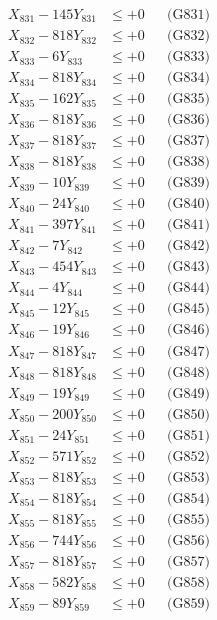 \documentclass[a4paper,10pt]{article}
\begin{document}
{\begin{align}
\allowbreak
X_{831} - 145Y_{831} &\leq +0 && \text{(G831)} \\
X_{832} - 818Y_{832} &\leq +0 && \text{(G832)} \\
X_{833} - 6Y_{833} &\leq +0 && \text{(G833)} \\
X_{834} - 818Y_{834} &\leq +0 && \text{(G834)} \\
X_{835} - 162Y_{835} &\leq +0 && \text{(G835)} \\
X_{836} - 818Y_{836} &\leq +0 && \text{(G836)} \\
X_{837} - 818Y_{837} &\leq +0 && \text{(G837)} \\
X_{838} - 818Y_{838} &\leq +0 && \text{(G838)} \\
X_{839} - 10Y_{839} &\leq +0 && \text{(G839)} \\
X_{840} - 24Y_{840} &\leq +0 && \text{(G840)} \\
\allowbreak
X_{841} - 397Y_{841} &\leq +0 && \text{(G841)} \\
X_{842} - 7Y_{842} &\leq +0 && \text{(G842)} \\
X_{843} - 454Y_{843} &\leq +0 && \text{(G843)} \\
X_{844} - 4Y_{844} &\leq +0 && \text{(G844)} \\
X_{845} - 12Y_{845} &\leq +0 && \text{(G845)} \\
X_{846} - 19Y_{846} &\leq +0 && \text{(G846)} \\
X_{847} - 818Y_{847} &\leq +0 && \text{(G847)} \\
X_{848} - 818Y_{848} &\leq +0 && \text{(G848)} \\
X_{849} - 19Y_{849} &\leq +0 && \text{(G849)} \\
X_{850} - 200Y_{850} &\leq +0 && \text{(G850)} \\
\allowbreak
X_{851} - 24Y_{851} &\leq +0 && \text{(G851)} \\
X_{852} - 571Y_{852} &\leq +0 && \text{(G852)} \\
X_{853} - 818Y_{853} &\leq +0 && \text{(G853)} \\
X_{854} - 818Y_{854} &\leq +0 && \text{(G854)} \\
X_{855} - 818Y_{855} &\leq +0 && \text{(G855)} \\
X_{856} - 744Y_{856} &\leq +0 && \text{(G856)} \\
X_{857} - 818Y_{857} &\leq +0 && \text{(G857)} \\
X_{858} - 582Y_{858} &\leq +0 && \text{(G858)} \\
X_{859} - 89Y_{859} &\leq +0 && \text{(G859)} \\

\end{align}}
\end{document}
